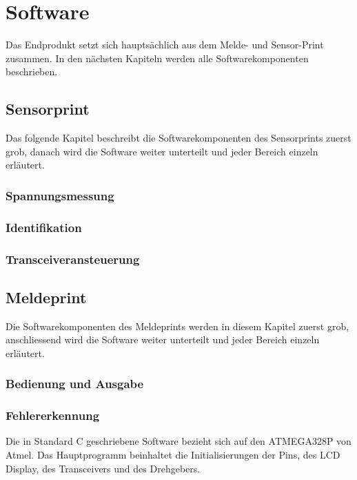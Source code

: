 \section{Software}
Das Endprodukt setzt sich hauptsächlich aus dem Melde- und Sensor-Print zusammen. In den nächsten Kapiteln werden alle Softwarekomponenten beschrieben.
\subsection{Sensorprint}
Das folgende Kapitel beschreibt die Softwarekomponenten des Sensorprints zuerst grob, danach wird die Software weiter unterteilt und jeder Bereich einzeln erläutert.
\subsubsection{Spannungsmessung}
\subsubsection{Identifikation}
\subsubsection{Transceiveransteuerung}
\subsection{Meldeprint}

Die Softwarekomponenten des Meldeprints werden in diesem Kapitel zuerst grob, anschliessend wird die Software weiter unterteilt und jeder Bereich einzeln erläutert. 
\subsubsection{Bedienung und Ausgabe}
\subsubsection{Fehlererkennung}
Die in Standard C geschriebene Software bezieht sich auf den ATMEGA328P von Atmel. Das Hauptprogramm beinhaltet die Initialisierungen der Pins, des LCD Display, des Transceivers und des Drehgebers.


